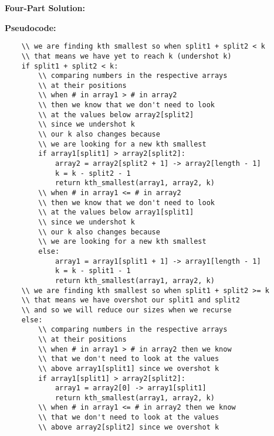 \documentclass[11pt]{article}
\newenvironment{FourPartSolution}{\par{\bf Four-Part Solution:}}{\smallskip}
\newenvironment{pseudocode}{\par{\bf Pseudocode:}}{\smallskip}
\begin{document}
\begin{FourPartSolution}
\begin{pseudocode}
\begin{lstlisting}
	\\ we are finding kth smallest so when split1 + split2 < k
	\\ that means we have yet to reach k (undershot k)
	if split1 + split2 < k:
		\\ comparing numbers in the respective arrays
		\\ at their positions
		\\ when # in array1 > # in array2
		\\ then we know that we don't need to look 
		\\ at the values below array2[split2]
		\\ since we undershot k
		\\ our k also changes because
		\\ we are looking for a new kth smallest
		if array1[split1] > array2[split2]:
			array2 = array2[split2 + 1] -> array2[length - 1]
			k = k - split2 - 1
			return kth_smallest(array1, array2, k)
		\\ when # in array1 <= # in array2
		\\ then we know that we don't need to look 
		\\ at the values below array1[split1]
		\\ since we undershot k
		\\ our k also changes because
		\\ we are looking for a new kth smallest
		else:
			array1 = array1[split1 + 1] -> array1[length - 1]
			k = k - split1 - 1
			return kth_smallest(array1, array2, k)
	\\ we are finding kth smallest so when split1 + split2 >= k
	\\ that means we have overshot our split1 and split2
	\\ and so we will reduce our sizes when we recurse
	else:
		\\ comparing numbers in the respective arrays
		\\ at their positions
		\\ when # in array1 > # in array2 then we know
		\\ that we don't need to look at the values
		\\ above array1[split1] since we overshot k
		if array1[split1] > array2[split2]:
			array1 = array2[0] -> array1[split1]
			return kth_smallest(array1, array2, k)
		\\ when # in array1 <= # in array2 then we know
		\\ that we don't need to look at the values
		\\ above array2[split2] since we overshot k

\end{lstlisting}
\end{pseudocode}
\end{FourPartSolution}
\end{document}
